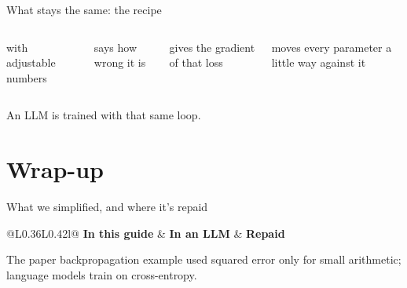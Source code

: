 \documentclass[aspectratio=169,11pt,t,\primeropts]{beamer}
\begin{document}
\begin{frame}{What stays the same: the recipe}
  \begin{columns}[T]
    \begin{keyidea}[function]
      with adjustable numbers
    \end{keyidea}
    \begin{keyidea}[loss]
      says how wrong it is
    \end{keyidea}
    \begin{keyidea}[backpropagation]
      gives the gradient of that loss
    \end{keyidea}
    \begin{keyidea}
      moves every parameter a little way against it
    \end{keyidea}
  \end{columns}
  \vspace{5mm}
  \begin{center}\large An LLM is trained with that same loop.\end{center}
\end{frame}

\section*{Wrap-up}

\begin{frame}{What we simplified, and where it's repaid}
  \begin{center}\small
  \begin{tabular}{@{}L{0.36\textwidth}L{0.42\textwidth}l@{}}
    \toprule
    \textbf{In this guide} & \textbf{In an LLM} & \textbf{Repaid}\\
    \midrule
    \bottomrule
  \end{tabular}
  \end{center}
  \vspace{2mm}
  {\small\color{primerMuted}The paper backpropagation example used squared error only for small
  arithmetic; language models train on cross-entropy.}
\end{frame}
\end{document}
